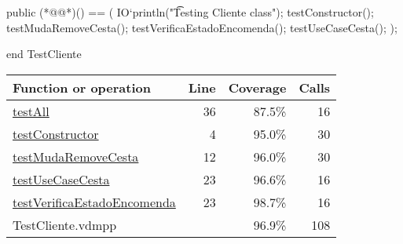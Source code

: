 \begin{vdmpp}[breaklines=true]
  public (*@@*)() == (
    IO`println("\t Testing Cliente class");
    testConstructor();
    testMudaRemoveCesta();
    testVerificaEstadoEncomenda();
    testUseCaseCesta();
  );

end TestCliente
\end{vdmpp}
\bigskip
\begin{longtable}{|l|r|r|r|}
\hline
Function or operation & Line & Coverage & Calls \\
\hline
\hline
\hyperref[testAll:36]{testAll} & 36&87.5\% & 16 \\
\hline
\hyperref[testConstructor:4]{testConstructor} & 4&95.0\% & 30 \\
\hline
\hyperref[testMudaRemoveCesta:12]{testMudaRemoveCesta} & 12&96.0\% & 30 \\
\hline
\hyperref[testUseCaseCesta:23]{testUseCaseCesta} & 23&96.6\% & 16 \\
\hline
\hyperref[testVerificaEstadoEncomenda:23]{testVerificaEstadoEncomenda} & 23&98.7\% & 16 \\
\hline
\hline
TestCliente.vdmpp & & 96.9\% & 108 \\
\hline
\end{longtable}

